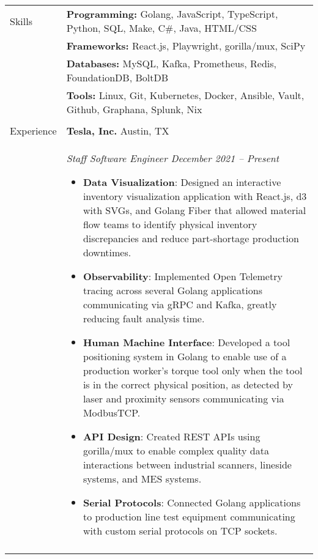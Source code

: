 \documentclass[11pt]{article}
\begin{document}
\noindent
\begin{tabular}[t]{@{}p{1.00in}@{} @{}p{6.00in}@{}}

{Skills}
&
\textbf{Programming:} Golang, JavaScript, TypeScript, Python, SQL, Make, C\#, Java, HTML/CSS%
\\
&
\textbf{Frameworks:} React.js, Playwright, gorilla/mux, SciPy%
\\
&
\textbf{Databases:} MySQL, Kafka, Prometheus, Redis, FoundationDB, BoltDB%
\\
&
\textbf{Tools:} Linux, Git, Kubernetes, Docker, Ansible, Vault, Github, Graphana, Splunk, Nix%
\\
\\

{Experience}
&
\textbf{Tesla, Inc.}  \hfill Austin, TX \\ &
 
    \textit{Staff Software Engineer \hfill December 2021 -- Present}
        \begin{itemize}[noitemsep,topsep=0pt]
            \item \textbf{Data Visualization}: Designed an interactive inventory visualization application with React.js, d3 with SVGs, and Golang Fiber that allowed material flow teams to identify physical inventory discrepancies and reduce part-shortage production downtimes.%
            \item \textbf{Observability}: Implemented Open Telemetry tracing across several Golang applications communicating via gRPC and Kafka, greatly reducing fault analysis time.%
            \item \textbf{Human Machine Interface}: Developed a tool positioning system in Golang to enable use of a production worker's torque tool only when the tool is in the correct physical position, as detected by laser and proximity sensors communicating via ModbusTCP.%
            \item \textbf{API Design}: Created REST APIs using gorilla/mux to enable complex quality data interactions between industrial scanners, lineside systems, and MES systems.%
            \item \textbf{Serial Protocols}: Connected Golang applications to production line test equipment communicating with custom serial protocols on TCP sockets.%
        \end{itemize}
\\ &
 

\end{tabular}
\end{document}
